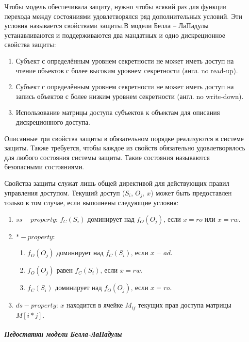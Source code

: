 Чтобы модель обеспечивала защиту, нужно чтобы всякий раз для функции перехода между состояниями удовлетворялся ряд дополнительных условий. Эти условия называется свойствами защиты.В модели Белла – ЛаПадулы устанавливаются и поддерживаются два мандатных и одно дискреционное свойства защиты\footnotemark:


\begin{enumerate}
    \item Субъект с определённым уровнем секретности не может иметь доступ на чтение объектов с более высоким уровнем секретности (англ. no read-up).
    \item Субъект с определённым уровнем секретности не может иметь доступ на запись объектов с более низким уровнем секретности (англ. no write-down).
    \item Использование матрицы доступа субъектов к объектам для описания дискреционного доступа.
\end{enumerate}

Описанные три свойства защиты в обязательном порядке реализуются в системе защиты. Также требуется, чтобы каждое из свойств обязательно удовлетворялось для любого состояния системы защиты. Такие состояния называются безопасными состояниями.

Свойства защиты служат лишь общей директивой для действующих правил управления доступом. Текущий доступ ($S_i$, $O_j$, $x$) может быть предоставлен только в том случае, если выполнены следующие условия:

\begin{enumerate}
	\item $ss-property$: $f_C(S_i)$ доминирует над $f_O(O_j)$, если $x = ro$ или $x = rw$.
	\item $*-property$:
	\begin{enumerate}
		\item $f_O (O_j)$ доминирует над $f_C(S_i)$, если $x = ad$.
		\item $f_O(O_j)$ равен $f_C(S_i)$, если $x = rw$.
		\item $f_C(S_i)$ доминирует над $f_O(O_j)$, если $x = ro$.
	\end{enumerate}
	\item $ds-property$: $x$ находится в ячейке $M_{ij}$ текущих прав доступа матрицы $M[i*j]$.
\end{enumerate}

\subparagraph{Недостатки модели Белла-ЛаПадулы}

